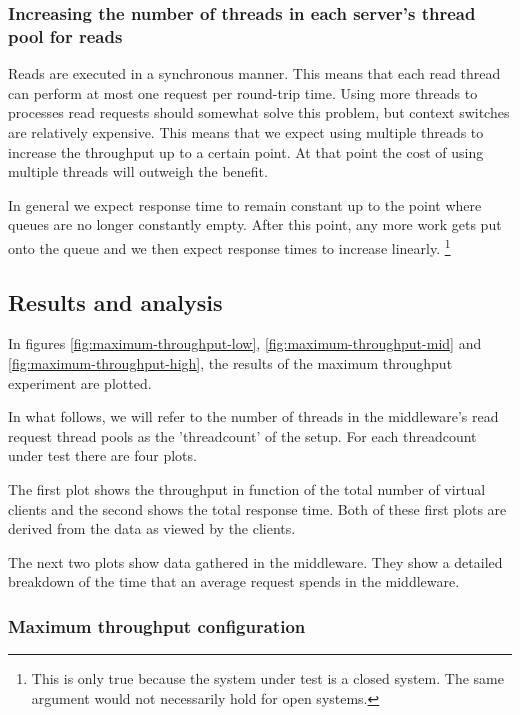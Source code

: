 \documentclass[11pt]{article}
\begin{document}
\subsubsection{Increasing the number of threads in each server's thread pool for reads}

Reads are executed in a synchronous manner.
This means that each read thread can perform at most one request per round-trip time.
Using more threads to processes read requests should somewhat solve this problem, but context switches are relatively expensive.
This means that we expect using multiple threads to increase the throughput up to a certain point.
At that point the cost of using multiple threads will outweigh the benefit.

In general we expect response time to remain constant up to the point where queues are no longer constantly empty.
After this point, any more work gets put onto the queue and we then expect response times to increase linearly.
\footnote{
  This is only true because the system under test is a closed system.
  The same argument would not necessarily hold for open systems.
}

\subsection{Results and analysis}

In figures \ref{fig:maximum-throughput-low}, \ref{fig:maximum-throughput-mid} and \ref{fig:maximum-throughput-high}, the results of the maximum throughput experiment are plotted.

In what follows, we will refer to the number of threads in the middleware's read request thread pools as the 'threadcount' of the setup.
For each threadcount under test there are four plots.

The first plot shows the throughput in function of the total number of virtual clients and the second shows the total response time.
Both of these first plots are derived from the data as viewed by the clients.

The next two plots show data gathered in the middleware.
They show a detailed breakdown of the time that an average request spends in the middleware.

\subsubsection{Maximum throughput configuration}

\end{document}
